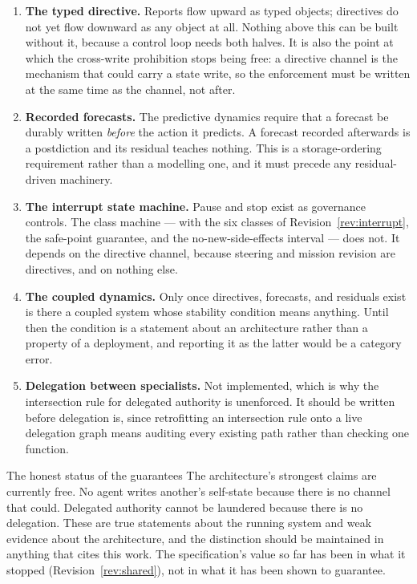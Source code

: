 \documentclass[11pt]{article}
\begin{document}
\begin{enumerate}[leftmargin=1.9em,itemsep=5pt]
\item \textbf{The typed directive.} Reports flow upward as typed objects; directives do not yet flow downward as any object at all. Nothing above this can be built without it, because a control loop needs both halves. It is also the point at which the cross-write prohibition stops being free: a directive channel is the mechanism that could carry a state write, so the enforcement must be written at the same time as the channel, not after.

\item \textbf{Recorded forecasts.} The predictive dynamics require that a forecast be durably written \emph{before} the action it predicts. A forecast recorded afterwards is a postdiction and its residual teaches nothing. This is a storage-ordering requirement rather than a modelling one, and it must precede any residual-driven machinery.

\item \textbf{The interrupt state machine.} Pause and stop exist as governance controls. The class machine --- with the six classes of Revision~\ref{rev:interrupt}, the safe-point guarantee, and the no-new-side-effects interval --- does not. It depends on the directive channel, because steering and mission revision are directives, and on nothing else.

\item \textbf{The coupled dynamics.} Only once directives, forecasts, and residuals exist is there a coupled system whose stability condition means anything. Until then the condition is a statement about an architecture rather than a property of a deployment, and reporting it as the latter would be a category error.

\item \textbf{Delegation between specialists.} Not implemented, which is why the intersection rule for delegated authority is unenforced. It should be written before delegation is, since retrofitting an intersection rule onto a live delegation graph means auditing every existing path rather than checking one function.
\end{enumerate}

\begin{claimbox}{The honest status of the guarantees}
The architecture's strongest claims are currently free. No agent writes another's self-state because there is no channel that could. Delegated authority cannot be laundered because there is no delegation. These are true statements about the running system and weak evidence about the architecture, and the distinction should be maintained in anything that cites this work. The specification's value so far has been in what it stopped (Revision~\ref{rev:shared}), not in what it has been shown to guarantee.
\end{claimbox}
\end{document}
